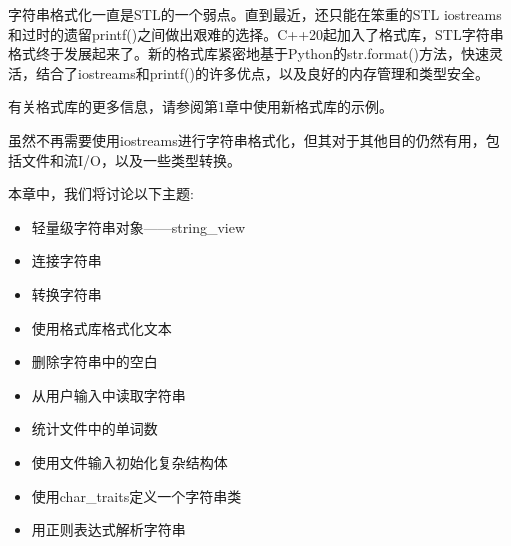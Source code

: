 字符串格式化一直是STL的一个弱点。直到最近，还只能在笨重的STL iostreams和过时的遗留printf()之间做出艰难的选择。C++20起加入了格式库，STL字符串格式终于发展起来了。新的格式库紧密地基于Python的str.format()方法，快速灵活，结合了iostreams和printf()的许多优点，以及良好的内存管理和类型安全。

有关格式库的更多信息，请参阅第1章中使用新格式库的示例。

虽然不再需要使用iostreams进行字符串格式化，但其对于其他目的仍然有用，包括文件和流I/O，以及一些类型转换。

本章中，我们将讨论以下主题:

\begin{itemize}
\item 
轻量级字符串对象——string\_view

\item 
连接字符串

\item 
转换字符串

\item 
使用格式库格式化文本

\item 
删除字符串中的空白

\item 
从用户输入中读取字符串

\item 
统计文件中的单词数

\item 
使用文件输入初始化复杂结构体

\item 
使用char\_traits定义一个字符串类

\item 
用正则表达式解析字符串
\end{itemize}


















